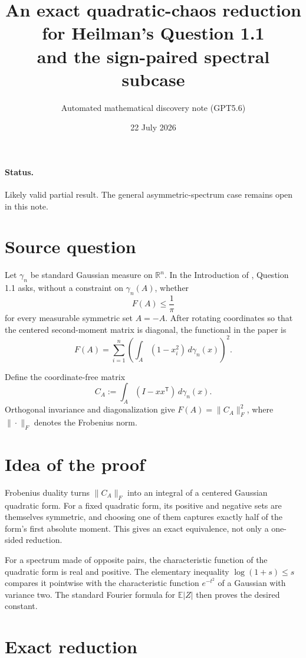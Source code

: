 \documentclass[11pt]{article}
\title{An exact quadratic-chaos reduction for Heilman's Question 1.1\\
and the sign-paired spectral subcase}
\author{Automated mathematical discovery note (GPT5.6)}
\date{22 July 2026}
\newcommand{\R}{\mathbb R}
\newcommand{\E}{\mathbb E}
\begin{document}
\maketitle

\paragraph{Status.}
Likely valid partial result.  The general asymmetric-spectrum case remains
open in this note.

\section{Source question}

Let $\gamma_n$ be standard Gaussian measure on $\R^n$.  In the Introduction
of \cite{Heilman2015}, Question 1.1 asks, without a constraint on
$\gamma_n(A)$, whether
\[
 F(A)\leq \frac1\pi
\]
for every measurable symmetric set $A=-A$.  After rotating coordinates so
that the centered second-moment matrix is diagonal, the functional in the
paper is
\[
 F(A)=\sum_{i=1}^n\left(\int_A(1-x_i^2)\,d\gamma_n(x)\right)^2.
\]

Define the coordinate-free matrix
\[
 C_A:=\int_A(I-xx^{\mathsf T})\,d\gamma_n(x).
\]
Orthogonal invariance and diagonalization give $F(A)=\|C_A\|_F^2$, where
$\|\cdot\|_F$ denotes the Frobenius norm.

\section{Idea of the proof}

Frobenius duality turns $\|C_A\|_F$ into an integral of a centered Gaussian
quadratic form.  For a fixed quadratic form, its positive and negative sets
are themselves symmetric, and choosing one of them captures exactly half of
the form's first absolute moment.  This gives an exact equivalence, not only
a one-sided reduction.

For a spectrum made of opposite pairs, the characteristic function of the
quadratic form is real and positive.  The elementary inequality
$\log(1+s)\leq s$ compares it pointwise with the characteristic function
$e^{-t^2}$ of a Gaussian with variance two.  The standard Fourier formula
for $\E|Z|$ then proves the desired constant.

\section{Exact reduction}
\end{document}
